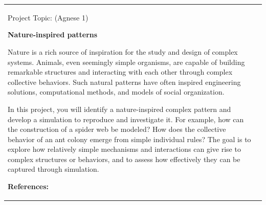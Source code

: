 \documentclass[a4paper,landscape]{article}
\newlength{\HeaderSize}
\newlength{\HeaderSizeBaseline}
\newlength{\SectionSize}
\newlength{\SectionSizeBaseline}
\newlength{\TextSize}
\newlength{\TextSizeBaseline}
\newlength{\vskipHeader}
\newlength{\vskipSection}
\newlength{\vskipText}
\newlength{\LeftPanel}
\newlength{\PanelGap}
\newlength{\RightPanel}
\begin{document}
\noindent
\begin{tabular}{@{}p{\LeftPanel}@{\hspace{\PanelGap}}p{\RightPanel}@{}}

\parbox[t][\LeftPanel][t]{\LeftPanel}{%

\begin{center}
  {\fontsize{\HeaderSize}{\HeaderSizeBaseline}\selectfont\color{topicblue}%
   Project Topic:\hspace{9mm} (Agnese 1)} 
\end{center}

\vspace{\vskipHeader}

{\fontsize{\SectionSize}{\SectionSizeBaseline}\selectfont\bfseries 
%
Nature-inspired patterns
\par}
\vspace{\vskipSection}

{\fontsize{\TextSize}{\TextSizeBaseline}\selectfont
%
Nature is a rich source of inspiration for the study and design of complex systems. Animals, even seemingly simple organisms, are capable of building remarkable structures and interacting with each other through complex collective behaviors. Such natural patterns have often inspired engineering solutions, computational methods, and models of social organization.
\par

\vspace{\vskipText}
In this project, you will identify a nature-inspired complex pattern and develop a simulation to reproduce and investigate it. For example, how can the construction of a spider web be modeled? How does the collective behavior of an ant colony emerge from simple individual rules? The goal is to explore how relatively simple mechanisms and interactions can give rise to complex structures or behaviors, and to assess how effectively they can be captured through simulation.
\par
}

\vfill

{\fontsize{\SectionSize}{\SectionSizeBaseline}\selectfont\bfseries References:\par}
\vspace{\vskipSection}

}
\end{tabular}
\end{document}
